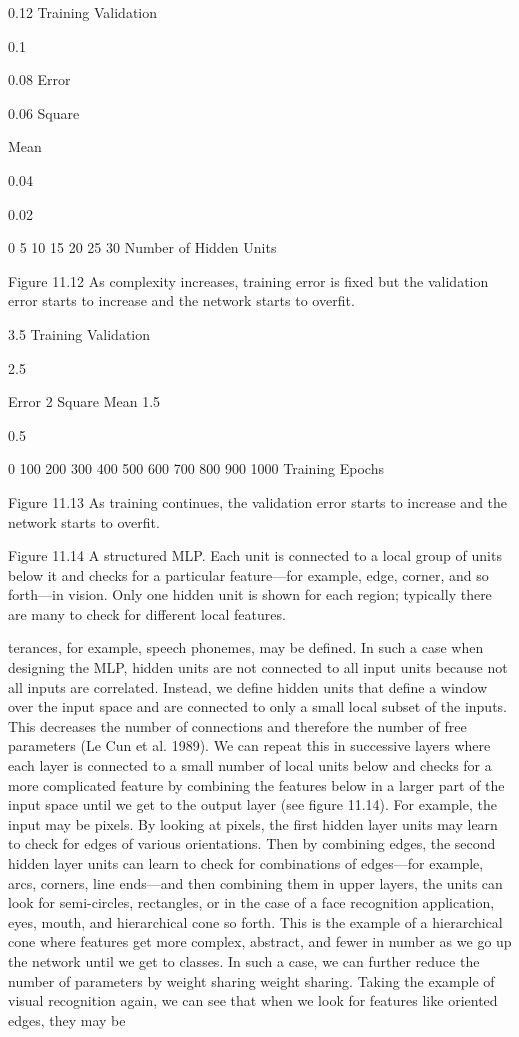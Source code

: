 0.12 Training Validation

0.1

0.08 Error

0.06 Square

Mean

0.04

0.02

0 5 10 15 20 25 30 Number of Hidden Units

Figure 11.12 As complexity increases, training error is fixed but the validation error starts to increase and the network starts to overfit.

3.5 Training Validation

2.5

Error 2 Square Mean 1.5

0.5

0 100 200 300 400 500 600 700 800 900 1000 Training Epochs

Figure 11.13 As training continues, the validation error starts to increase and the network starts to overfit.

Figure 11.14 A structured MLP. Each unit is connected to a local group of units below it and checks for a particular feature---for example, edge, corner, and so forth---in vision. Only one hidden unit is shown for each region; typically there are many to check for different local features.

terances, for example, speech phonemes, may be defined. In such a case when designing the MLP, hidden units are not connected to all input units because not all inputs are correlated. Instead, we define hidden units that define a window over the input space and are connected to only a small local subset of the inputs. This decreases the number of connections and therefore the number of free parameters (Le Cun et al. 1989). We can repeat this in successive layers where each layer is connected to a small number of local units below and checks for a more complicated feature by combining the features below in a larger part of the input space until we get to the output layer (see figure 11.14). For example, the input may be pixels. By looking at pixels, the first hidden layer units may learn to check for edges of various orientations. Then by combining edges, the second hidden layer units can learn to check for combinations of edges---for example, arcs, corners, line ends---and then combining them in upper layers, the units can look for semi-circles, rectangles, or in the case of a face recognition application, eyes, mouth, and hierarchical cone so forth. This is the example of a hierarchical cone where features get more complex, abstract, and fewer in number as we go up the network until we get to classes. In such a case, we can further reduce the number of parameters by weight sharing weight sharing. Taking the example of visual recognition again, we can see that when we look for features like oriented edges, they may be

